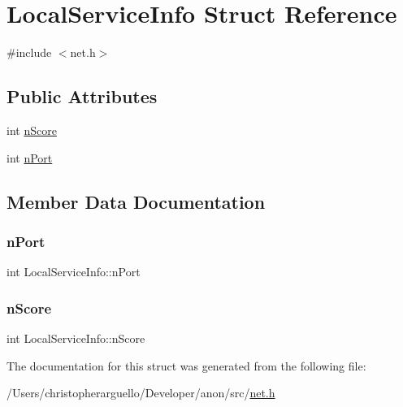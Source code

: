 \hypertarget{struct_local_service_info}{}\section{Local\+Service\+Info Struct Reference}
\label{struct_local_service_info}


{\ttfamily \#include $<$net.\+h$>$}

\subsection*{Public Attributes}
\begin{DoxyCompactItemize}
\item 
int \mbox{\hyperlink{struct_local_service_info_ad6a9d404fb109ba1506df3f6ca842ed5}{n\+Score}}
\item 
int \mbox{\hyperlink{struct_local_service_info_aa5c39fec8cc69a43e393bb158f69224b}{n\+Port}}
\end{DoxyCompactItemize}


\subsection{Member Data Documentation}
\mbox{\label{struct_local_service_info_aa5c39fec8cc69a43e393bb158f69224b}} 
\subsubsection{\texorpdfstring{n\+Port}{nPort}}
{\footnotesize\ttfamily int Local\+Service\+Info\+::n\+Port}

\mbox{\label{struct_local_service_info_ad6a9d404fb109ba1506df3f6ca842ed5}} 
\subsubsection{\texorpdfstring{n\+Score}{nScore}}
{\footnotesize\ttfamily int Local\+Service\+Info\+::n\+Score}



The documentation for this struct was generated from the following file\+:\begin{DoxyCompactItemize}
\item 
/\+Users/christopherarguello/\+Developer/anon/src/\mbox{\hyperlink{net_8h}{net.\+h}}\end{DoxyCompactItemize}
